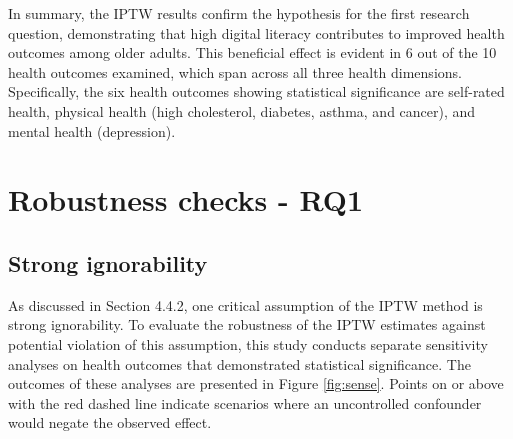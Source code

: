 In summary, the IPTW results confirm the hypothesis for the first research question, demonstrating that high digital literacy contributes to improved health outcomes among older adults. This beneficial effect is evident in 6 out of the 10 health outcomes examined, which span across all three health dimensions. Specifically, the six health outcomes showing statistical significance are self-rated health, physical health (high cholesterol, diabetes, asthma, and cancer), and mental health (depression).

\section{Robustness checks - RQ1}

\subsection{Strong ignorability}
As discussed in Section 4.4.2, one critical assumption of the IPTW method is strong ignorability. To evaluate the robustness of the IPTW estimates against potential violation of this assumption, this study conducts separate sensitivity analyses on health outcomes that demonstrated statistical significance. The outcomes of these analyses are presented in Figure \ref{fig:sense}. Points on or above with the red dashed line indicate scenarios where an uncontrolled confounder would negate the observed effect.


